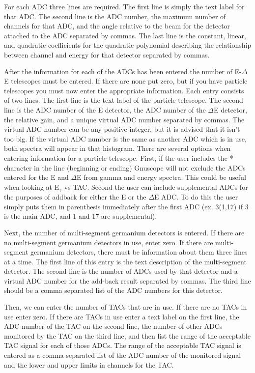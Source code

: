 \begin{itemize}
 For each ADC three lines are required.  The first line is simply the text label for that ADC.  The second line is the ADC number, the maximum number of channels for that ADC, and the angle relative to the beam for the detector attached to the ADC separated by commas.  The last line is the constant, linear, and quadratic coefficients for the quadratic polynomial describing the relationship between channel and energy for that detector separated by commas.

  After the information for each of the ADCs has been entered the number of E-$\Delta$E telescopes must be entered.  If there are none put zero, but if you have particle telescopes you must now enter the appropriate information.  Each entry consists of two lines.  The first line is the text label of the particle telescope.  The second line is the ADC number of the E detector, the ADC number of the $\Delta$E detector, the relative gain, and a unique virtual ADC number separated by commas.  The virtual ADC number can be any positive integer, but it is advised that it isn't too big.  If the virtual ADC number is the same as another ADC which is in use, both spectra will appear in that histogram.  There are several options when entering information for a particle telescope.  First, if the user includes the * character in the line (beginning or ending) Gnuscope will not exclude the ADCs entered for the E and $\Delta$E from gamma and energy spectra.  This could be useful when looking at E$_\gamma$ vs TAC.  Second the user can include supplemental ADCs for the purposes of addback for either the E or the $\Delta$E ADC.  To do this the user simply puts them in parenthesis immediately after the first ADC (ex. 3(1,17) if 3 is the main ADC, and 1 and 17 are supplemental). 

 Next, the number of multi-segment germanium detectors is entered.  If there are no multi-segment germanium detectors in use, enter zero.  If there are multi-segment germanium detectors, there must be information about them three lines at a time.  The first line of this entry is the text description of the multi-segment detector.  The second line is the number of ADCs used by that detector and a virtual ADC number for the add-back result separated by commas.  The third line should be a comma separated list of the ADC numbers for this detector.  

Then, we can enter the number of TACs that are in use.  If there are no TACs in use enter zero.  If there are TACs in use enter a text label on the first line, the ADC number of the TAC on the second line, the number of other ADCs monitored by the TAC on the third line, and then list the range of the acceptable TAC signal for each of those ADCs.  The range of the acceptable TAC signal is entered as a comma separated list of the ADC number of the monitored signal and the lower and upper limits in channels for the TAC.  


\end{itemize}
